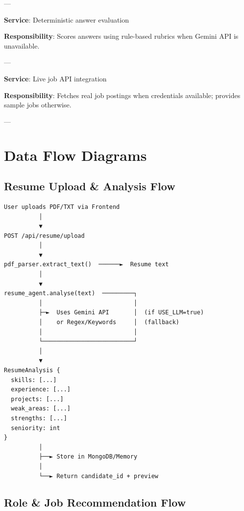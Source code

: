 \documentclass[11pt]{article}
\begin{document}
\begin{description}[leftmargin=3cm, style=nextline]
  ---

  \item[\textbf{rubric\_service}]
  \textbf{Service}: Deterministic answer evaluation

  \textbf{Responsibility}: Scores answers using rule-based rubrics when Gemini API is unavailable.

  ---

  \item[\textbf{adzuna\_job\_fetcher}]
  \textbf{Service}: Live job API integration

  \textbf{Responsibility}: Fetches real job postings when credentials available; provides sample jobs otherwise.

  ---

\end{description}

\newpage

\section{Data Flow Diagrams}

\subsection{Resume Upload \& Analysis Flow}

\begin{verbatim}
User uploads PDF/TXT via Frontend
          │
          ▼
POST /api/resume/upload
          │
          ▼
pdf_parser.extract_text()  ──────►  Resume text
          │
          ▼
resume_agent.analyse(text)  ─────────┐
          │                          │
          ├─►  Uses Gemini API       │  (if USE_LLM=true)
          │    or Regex/Keywords     │  (fallback)
          │                          │
          └──────────────────────────┘
          │
          ▼
ResumeAnalysis {
  skills: [...]
  experience: [...]
  projects: [...]
  weak_areas: [...]
  strengths: [...]
  seniority: int
}
          │
          ├──► Store in MongoDB/Memory
          │
          └──► Return candidate_id + preview
\end{verbatim}

\subsection{Role \& Job Recommendation Flow}
\end{document}
